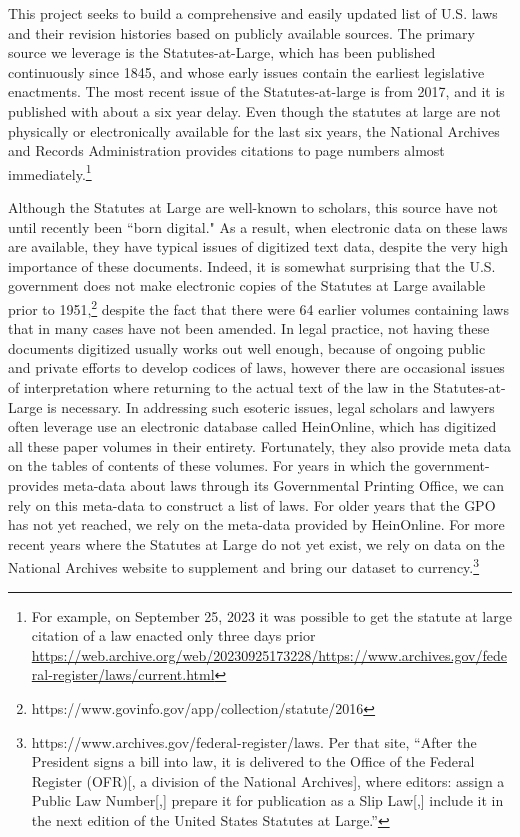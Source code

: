 \documentclass[fleqn,10pt]{wlscirep}
\begin{document}
This project seeks to build a comprehensive and easily updated list of U.S. laws and their revision histories based on publicly available sources. The primary source we leverage is the Statutes-at-Large, which has been published continuously since 1845, and whose early issues contain the earliest legislative enactments. The most recent issue of the Statutes-at-large is from 2017, and it is published with about a six year delay. Even though the statutes at large are not physically or electronically available for the last six years, the National Archives and Records Administration provides citations to page numbers almost immediately.\footnote{For example, on September 25, 2023 it was possible to get the statute at large citation of a law enacted only three days prior \url{https://web.archive.org/web/20230925173228/https://www.archives.gov/federal-register/laws/current.html}} 

Although the Statutes at Large are well-known to scholars, this source have not until recently been ``born digital." As a result, when electronic data on these laws are available, they have typical issues of digitized text data, despite the very high importance of these documents. Indeed, it is somewhat surprising that the U.S. government does not make electronic copies of the Statutes at Large available prior to 1951,\footnote{https://www.govinfo.gov/app/collection/statute/2016} despite the fact that there were 64 earlier volumes containing laws that in many cases have not been amended. In legal practice, not having these documents digitized usually works out well enough, because of ongoing public and private efforts to develop codices of laws, however there are occasional issues of interpretation where returning to the actual text of the law in the Statutes-at-Large is necessary. In addressing such esoteric issues, legal scholars and lawyers often leverage use an electronic database called HeinOnline, which has digitized all these paper volumes in their entirety. Fortunately, they also provide meta data on the tables of contents of these volumes. For years in which the government-provides meta-data about laws through its Governmental Printing Office, we can rely on this meta-data to construct a list of laws. For older years that the GPO has not yet reached, we rely on the meta-data provided by HeinOnline. For more recent years where the Statutes at Large do not yet exist, we rely on data on the National Archives website to supplement and bring our dataset to currency.\footnote{https://www.archives.gov/federal-register/laws. Per that site, ``After the President signs a bill into law, it is delivered to the Office of the Federal Register (OFR)[, a division of the National Archives], where editors: assign a Public Law Number[,] prepare it for publication as a Slip Law[,] include it in the next edition of the United States Statutes at Large.''}
\end{document}
